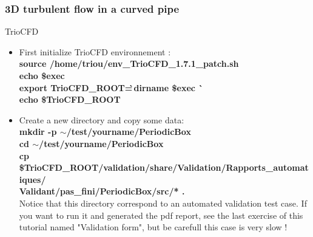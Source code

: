 \documentclass[10pt]{beamer}
\begin{document}
\begin{frame}
\frametitle{3D turbulent flow in a curved pipe}
\begin{block}{TrioCFD}

\begin{itemize}
\item First initialize TrioCFD environnement :\\
{\small{
\textbf{source /home/triou/env\_TrioCFD\_1.7.1\_patch.sh }\\
\textbf{echo \$exec} \\
\textbf{export TrioCFD\_ROOT=\`\,dirname \$exec \`} \\
\textbf{echo \$TrioCFD\_ROOT} \\
}}

\item Create a new directory and copy some data:\\
{\small{
\textbf{mkdir -p $\sim$/test/yourname/PeriodicBox} \\
\textbf{cd $\sim$/test/yourname/PeriodicBox} \\
\textbf{cp \$TrioCFD\_ROOT/validation/share/Validation/Rapports\_automatiques/} \\
\hspace{4cm} \textbf{Validant/pas\_fini/PeriodicBox/src/* \; .} \\
}}
\vspace{0.2cm}
Notice that this directory correspond to an automated validation test case. 
If you want to run it and generated the pdf report, see the last exercise of this tutorial named "Validation form", but be carefull this case is very slow !
\end{itemize}

\end{block}
\end{frame}
\end{document}
